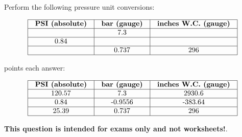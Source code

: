 

Perform the following pressure unit conversions:


$$\vbox{\offinterlineskip
\halign{\strut
\vrule \quad\hfil # \ \hfil & 
\vrule \quad\hfil # \ \hfil & 
\vrule \quad\hfil # \ \hfil \vrule \cr
\noalign{\hrule}
%
{\bf PSI (absolute)} & {\bf bar (gauge)} & {\bf inches W.C. (gauge)} \cr
%
\noalign{\hrule}
%
 & 7.3 &  \cr
%
\noalign{\hrule}
%
0.84 &  &  \cr
%
\noalign{\hrule}
%
 & 0.737 & 296 \cr
%
\noalign{\hrule}
} %
}$$ %







 points each answer:

\vskip 10pt


$$\vbox{\offinterlineskip
\halign{\strut
\vrule \quad\hfil # \ \hfil & 
\vrule \quad\hfil # \ \hfil & 
\vrule \quad\hfil # \ \hfil \vrule \cr
\noalign{\hrule}
%
{\bf PSI (absolute)} & {\bf bar (gauge)} & {\bf inches W.C. (gauge)} \cr
%
\noalign{\hrule}
%
120.57 & 7.3 & 2930.6 \cr
%
\noalign{\hrule}
%
0.84 & -0.9556 & -383.64 \cr
%
\noalign{\hrule}
%
25.39 & 0.737 & 296 \cr
%
\noalign{\hrule}
} %
}$$ %







{\bf This question is intended for exams only and not worksheets!}.



